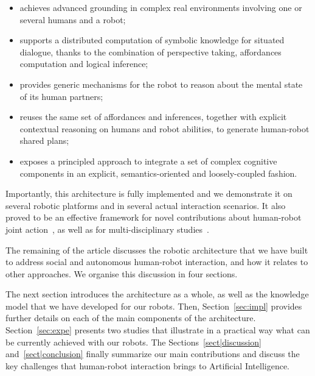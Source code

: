 \documentclass[preprint,3p,times]{elsarticle}
\begin{document}
\begin{itemize}

    \item achieves advanced grounding in complex real environments involving one or
        several humans and a robot;

    \item supports a distributed computation of symbolic knowledge for
        situated dialogue, thanks to the combination of perspective taking,
        affordances computation and logical inference;

    \item provides generic mechanisms for the robot to reason about the mental state
        of its human partners;

    \item reuses the same set of affordances and inferences, together with
        explicit contextual reasoning on humans and robot abilities, to generate
        human-robot shared plans;

    \item exposes a principled approach to integrate a set of complex cognitive
        components in an explicit, semantics-oriented and loosely-coupled
        fashion.

\end{itemize}

Importantly, this architecture is fully implemented and we demonstrate it on
several robotic platforms and in several actual interaction scenarios. It also proved
to be an effective framework for novel contributions about human-robot joint
action~\cite{fiore2016planning,devin2016implemented,milliez2016using}, as well
as for multi-disciplinary studies~\cite{dautenhahn2006may,koay2007exploratory,Ros2010b,dehais2011physiological,ferreira2015users,GharbiROMAN2015}.

\vspace{0.5cm}
The remaining of the article discusses the robotic architecture that we have
built to address social and autonomous human-robot interaction, and how it
relates to other approaches. We organise this discussion in four sections.

The next section introduces the architecture as a whole, as well as the
knowledge model that we have developed for our robots. Then,
Section~\ref{sec:impl} provides further details on each of the main components of the architecture.
Section~\ref{sec:expe} presents two studies that illustrate in a practical way
what can be currently achieved with our robots.  The
Sections~\ref{sect|discussion} and~\ref{sect|conclusion} finally summarize our
main contributions and discuss the key challenges that human-robot interaction
brings to Artificial Intelligence.
\end{document}
